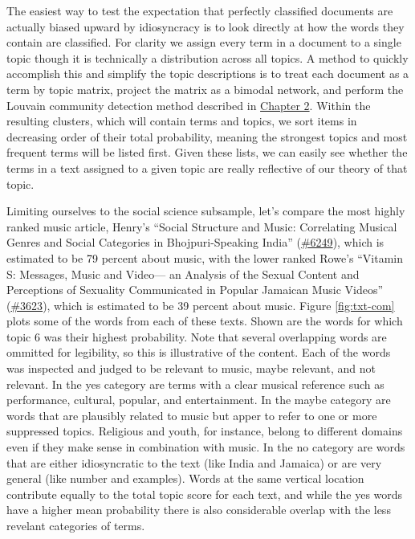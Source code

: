 \documentclass[]{book}
\theoremstyle{definition}
\theoremstyle{definition}
\theoremstyle{definition}
\theoremstyle{remark}
\begin{document}
The easiest way to test the expectation that perfectly classified
documents are actually biased upward by idiosyncracy is to look directly
at how the words they contain are classified. For clarity we assign
every term in a document to a single topic though it is technically a
distribution across all topics. A method to quickly accomplish this and
simplify the topic descriptions is to treat each document as a term by
topic matrix, project the matrix as a bimodal network, and perform the
Louvain community detection method described in
\protect\hyperlink{network-community-detection}{Chapter 2}. Within the
resulting clusters, which will contain terms and topics, we sort items
in decreasing order of their total probability, meaning the strongest
topics and most frequent terms will be listed first. Given these lists,
we can easily see whether the terms in a text assigned to a given topic
are really reflective of our theory of that topic.

Limiting ourselves to the social science subsample, let's compare the
most highly ranked music article, Henry's ``Social Structure and Music:
Correlating Musical Genres and Social Categories in Bhojpuri-Speaking
India'' (\href{www.jstor.org/stable/10.2307/836786}{\#6249}), which is
estimated to be 79 percent about music, with the lower ranked Rowe's
``Vitamin S: Messages, Music and Video--- an Analysis of the Sexual
Content and Perceptions of Sexuality Communicated in Popular Jamaican
Music Videos'' (\href{www.jstor.org/stable/10.2307/24384502}{\#3623}),
which is estimated to be 39 percent about music. Figure
\ref{fig:txt-com} plots some of the words from each of these texts.
Shown are the words for which topic 6 was their highest probability.
Note that several overlapping words are ommitted for legibility, so this
is illustrative of the content. Each of the words was inspected and
judged to be relevant to music, maybe relevant, and not relevant. In the
yes category are terms with a clear musical reference such as
performance, cultural, popular, and entertainment. In the maybe category
are words that are plausibly related to music but apper to refer to one
or more suppressed topics. Religious and youth, for instance, belong to
different domains even if they make sense in combination with music. In
the no category are words that are either idiosyncratic to the text
(like India and Jamaica) or are very general (like number and examples).
Words at the same vertical location contribute equally to the total
topic score for each text, and while the yes words have a higher mean
probability there is also considerable overlap with the less revelant
categories of terms.
\end{document}
